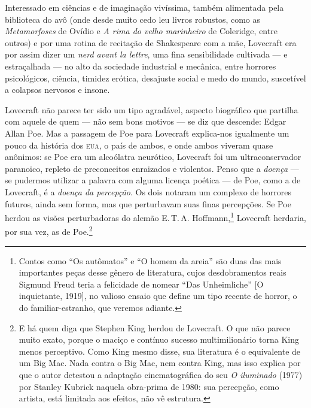 Interessado em ciências e de imaginação vivíssima, também alimentada
pela biblioteca do avô (onde desde muito cedo leu livros robustos, como
as \emph{Metamorfoses} de Ovídio e \emph{A rima do velho marinheiro} de
Coleridge, entre outros) e por uma rotina de recitação de Shakespeare
com a mãe, Lovecraft era por assim dizer um \emph{nerd avant la lettre},
uma fina sensibilidade cultivada --- e estraçalhada --- no alto da
sociedade industrial e mecânica, entre horrores psicológicos, ciência,
timidez erótica, desajuste social e medo do mundo, suscetível a colapsos
nervosos e insone.

Lovecraft não parece ter sido um tipo agradável, aspecto biográfico que
partilha com aquele de quem --- não sem bons motivos --- se diz que
descende: Edgar Allan Poe. Mas a passagem de Poe para
Lovecraft explica-nos igualmente um pouco da história dos \textsc{eua}, o país de
ambos, e onde ambos viveram quase anônimos: se Poe era um alcoólatra
neurótico, Lovecraft foi um ultraconservador paranoico, repleto de
preconceitos enraizados e violentos. Penso que a \emph{doença} --- se
pudermos utilizar a palavra com alguma licença poética --- de Poe, como a
de Lovecraft, é a \emph{doença da percepção}. Os dois notaram um complexo
de horrores futuros, ainda sem forma, mas que perturbavam suas finas
percepções. Se Poe herdou as visões perturbadoras do alemão E.\,T.\,A.
Hoffmann,\footnote{Contos como ``Os autômatos'' e ``O homem da areia'' são duas das mais importantes
  peças desse gênero de literatura, cujos desdobramentos reais Sigmund
  Freud teria a felicidade de nomear ``Das Unheimliche'' [O inquietante,
  1919], no valioso ensaio que define um tipo recente de horror, o do
  familiar-estranho, que veremos adiante.} Lovecraft herdaria, por sua
vez, as de Poe.\footnote{E há quem diga que Stephen King herdou de
  Lovecraft. O que não parece muito exato, porque o maciço e contínuo
  sucesso multimilionário torna King menos perceptivo. Como King mesmo
  disse, sua literatura é o equivalente de um Big Mac. Nada contra o Big
  Mac, nem contra King, mas isso explica por que o autor detestou a
  adaptação cinematográfica do seu \emph{O iluminado} (1977) por Stanley Kubrick naquela obra-prima de 1980: sua percepção,
  como artista, está limitada aos efeitos, não vê estrutura.}

